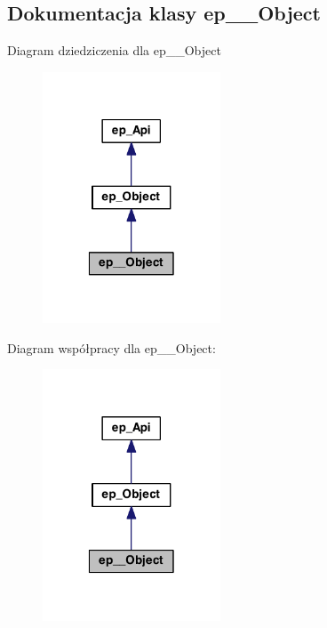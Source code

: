 \hypertarget{classep_____object}{\subsection{Dokumentacja klasy ep\-\_\-\-\_\-\-Object}
\label{classep_____object}
}


Diagram dziedziczenia dla ep\-\_\-\-\_\-\-Object\nopagebreak
\begin{figure}[H]
\begin{center}
\leavevmode
\includegraphics[width=150pt]{classep_____object__inherit__graph}
\end{center}
\end{figure}


Diagram współpracy dla ep\-\_\-\-\_\-\-Object\-:\nopagebreak
\begin{figure}[H]
\begin{center}
\leavevmode
\includegraphics[width=150pt]{classep_____object__coll__graph}
\end{center}
\end{figure}
